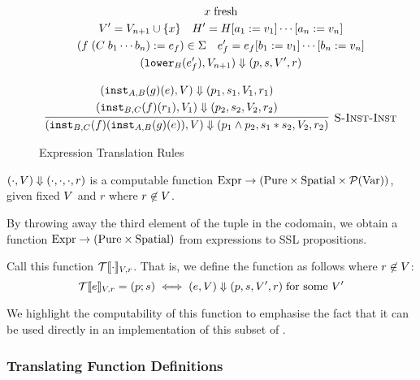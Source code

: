 \begin{figure}
{\[\begin{array}{c}
{\begin{gathered}
      \\  \freshVar{x}
      \\  \VarSet' = \VarSet_{n+1} \cup \{x\}
      ~~~ H' = H[a_1 := v_1]\cdots[a_n := v_n]
      \\
          (f\; (C\; b_1 \cdots b_n) := e_f) \in \Sigma
      ~~~ e_f' = e_f[b_1 := v_1]\cdots[b_n := v_n]
      \\  (\lowerS{B}{e_f'}, \VarSet_{n+1}) \tstep (p, s, \VarSet', r)
     \end{gathered}
    }
  \\\\
  \labinfer[S-Inst-Inst]{
      (\instantiateS{B,C}{f}(\instantiateS{A,B}{g}(e)), \VarSet) \tstep (p_1 \land p_2, s_1 \sep s_2, \VarSet_2, r_2)
    }
    {\begin{gathered}
      (\instantiateS{A,B}{g}(e), \VarSet) \tstep (p_1, s_1, \VarSet_1, r_1)
      \\ (\instantiateS{B,C}{f}(r_1), \VarSet_1) \tstep (p_2, s_2, \VarSet_2, r_2)
     \end{gathered}
    }
\end{array}
\]
}
\caption{Expression Translation Rules}
\label{fig:expr-rules}
\end{figure}

\begin{lemma} \label{thm:ssem-fn} $(\cdot, V) \Downarrow (\cdot, \cdot, \cdot, r)$ is a computable function $\textnormal{Expr} \rightarrow (\textnormal{Pure} \times \textnormal{Spatial} \times \mathcal{P}(\textnormal{Var}))$, given fixed
  $V$ and $r$ where $r \not\in V$.

By throwing away the third element of the tuple in the codomain, we obtain a function $\textnormal{Expr} \rightarrow (\textnormal{Pure} \times \textnormal{Spatial})$ from expressions to
SSL propositions.

  Call this function $\mathcal{T}\llbracket\cdot\rrbracket_{V, r}$. That is, we define the function as follows where $r \not\in V$:
  \[
    \mathcal{T}\llbracket e\rrbracket_{V, r} = (p ; s) \iff (e, V) \Downarrow (p, s, V', r)\; \textnormal{for some $V'$}
  \]
\end{lemma}

We highlight the computability of this function to emphasise the fact
that it can be used directly in an implementation of this subset of
\tool.

\subsubsection{Translating Function Definitions}

